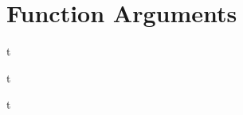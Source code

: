 \documentclass[../lecture4-functions.tex]{subfiles}
\begin{document}
\section{Function Arguments}


\begin{frame}[fragile]{}
t
\end{frame}


\begin{frame}[fragile]{}
t
\end{frame}


\begin{frame}[fragile]{}
t
\end{frame}

\end{document}
